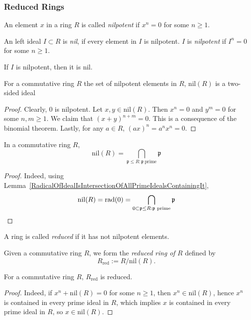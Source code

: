 \subsubsection{Reduced Rings}
    \begin{definition}
        An element $x$ in a ring $R$ is called \emph{nilpotent} if $x^n=0$ for some $n\geq 1$. 
    \end{definition}
    \begin{definition}
        An left ideal $I\subset R$ is \emph{nil}, if every element in $I$ is nilpotent. $I$ is \emph{nilpotent} if $I^n=0$ for some $n\geq 1$.
    \end{definition}
    \begin{remark}
        If $I$ is nilpotent, then it is nil. 
    \end{remark}
    \begin{lemma}
        For a commutative ring $R$ the set of nilpotent elements in $R$, $\mathrm{nil}(R)$ is a two-sided ideal
    \end{lemma}
    \begin{proof}
        Clearly, $0$ is nilpotent. Let $x,y\in \mathrm{nil}(R)$. Then $x^n=0$ and $y^m=0$ for some $n,m\geq 1$. We claim that $(x+y)^{n+m}=0$. This is a consequence of the binomial theorem. Lastly, for any $a\in R$, $(ax)^n= a^nx^n =0$.
    \end{proof}
    \begin{lemma}
        In a commutative ring $R$,  
        $$
            \mathrm{nil}(R) = \bigcap_{\mathfrak{p}\leq R : \mathfrak{p}\ \mathrm{prime}} \mathfrak{p}
        $$
    \end{lemma}
    \begin{proof}
        Indeed, using Lemma~\ref{RadicalOfIdealIsIntersectionOfAllPrimeIdealsContainingIt}, 
        $$
            \mathrm{nil}(R) = \mathrm{rad}(0) = \bigcap_{0\subset \mathfrak{p}\leq R : \mathfrak{p} \text{ prime}} \mathfrak{p}
        $$
    \end{proof}
    \begin{definition}
        A ring is called \emph{reduced} if it has not nilpotent elements. 
    \end{definition}
    \begin{definition}
        Given a commutative ring $R$, we form the \emph{reduced ring of $R$} defined by 
        $$
            R_\mathrm{red} := R/\mathrm{nil}(R).
        $$
    \end{definition}
    \begin{lemma}
        For a commutative ring $R$, $R_\mathrm{red}$ is reduced. 
    \end{lemma}
    \begin{proof}
        Indeed, if $x^n+\mathrm{nil}(R)=0$ for some $n\geq 1$, then $x^n\in \mathrm{nil}(R)$, hence $x^n$ is contained in every prime ideal in $R$, which implies $x$ is contained in every prime ideal in $R$, so $x\in \mathrm{nil}(R)$.
    \end{proof}
